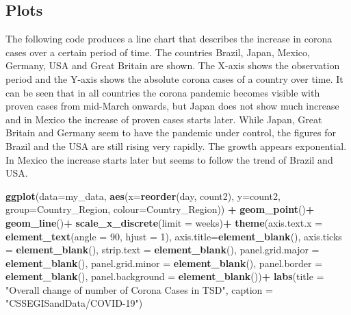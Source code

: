 \documentclass[]{article}
\newenvironment{Shaded}{\begin{snugshade}}{\end{snugshade}}
\newcommand{\DataTypeTok}[1]{\textcolor[rgb]{0.13,0.29,0.53}{#1}}
\newcommand{\DecValTok}[1]{\textcolor[rgb]{0.00,0.00,0.81}{#1}}
\newcommand{\KeywordTok}[1]{\textcolor[rgb]{0.13,0.29,0.53}{\textbf{#1}}}
\newcommand{\NormalTok}[1]{#1}
\newcommand{\OperatorTok}[1]{\textcolor[rgb]{0.81,0.36,0.00}{\textbf{#1}}}
\newcommand{\StringTok}[1]{\textcolor[rgb]{0.31,0.60,0.02}{#1}}
\begin{document}
\hypertarget{plots}{%
\subsection{Plots}\label{plots}}

The following code produces a line chart that describes the increase in
corona cases over a certain period of time. The countries Brazil, Japan,
Mexico, Germany, USA and Great Britain are shown. The X-axis shows the
observation period and the Y-axis shows the absolute corona cases of a
country over time. It can be seen that in all countries the corona
pandemic becomes visible with proven cases from mid-March onwards, but
Japan does not show much increase and in Mexico the increase of proven
cases starts later. While Japan, Great Britain and Germany seem to have
the pandemic under control, the figures for Brazil and the USA are still
rising very rapidly. The growth appears exponential. In Mexico the
increase starts later but seems to follow the trend of Brazil and USA.

\begin{Shaded}
\begin{Highlighting}[]
\KeywordTok{ggplot}\NormalTok{(}\DataTypeTok{data=}\NormalTok{my_data, }\KeywordTok{aes}\NormalTok{(}\DataTypeTok{x=}\KeywordTok{reorder}\NormalTok{(day, count2), }\DataTypeTok{y=}\NormalTok{count2, }
                         \DataTypeTok{group=}\NormalTok{Country_Region, }\DataTypeTok{colour=}\NormalTok{Country_Region)) }\OperatorTok{+}
\StringTok{  }\KeywordTok{geom_point}\NormalTok{()}\OperatorTok{+}
\StringTok{  }\KeywordTok{geom_line}\NormalTok{()}\OperatorTok{+}
\StringTok{  }\KeywordTok{scale_x_discrete}\NormalTok{(}\DataTypeTok{limit =}\NormalTok{ weeks)}\OperatorTok{+}
\StringTok{  }\KeywordTok{theme}\NormalTok{(}\DataTypeTok{axis.text.x =} \KeywordTok{element_text}\NormalTok{(}\DataTypeTok{angle =} \DecValTok{90}\NormalTok{, }\DataTypeTok{hjust =} \DecValTok{1}\NormalTok{),}
        \DataTypeTok{axis.title=}\KeywordTok{element_blank}\NormalTok{(),}
        \DataTypeTok{axis.ticks =} \KeywordTok{element_blank}\NormalTok{(),}
        \DataTypeTok{strip.text =} \KeywordTok{element_blank}\NormalTok{(),}
        \DataTypeTok{panel.grid.major =} \KeywordTok{element_blank}\NormalTok{(), }
        \DataTypeTok{panel.grid.minor =} \KeywordTok{element_blank}\NormalTok{(), }
        \DataTypeTok{panel.border =} \KeywordTok{element_blank}\NormalTok{(), }
        \DataTypeTok{panel.background =} \KeywordTok{element_blank}\NormalTok{())}\OperatorTok{+}
\StringTok{ }\KeywordTok{labs}\NormalTok{(}\DataTypeTok{title =}  \StringTok{"Overall change of number of Corona Cases in TSD"}\NormalTok{,}
       \DataTypeTok{caption =} \StringTok{"CSSEGISandData/COVID-19"}\NormalTok{)}
\end{Highlighting}
\end{Shaded}
\end{document}
